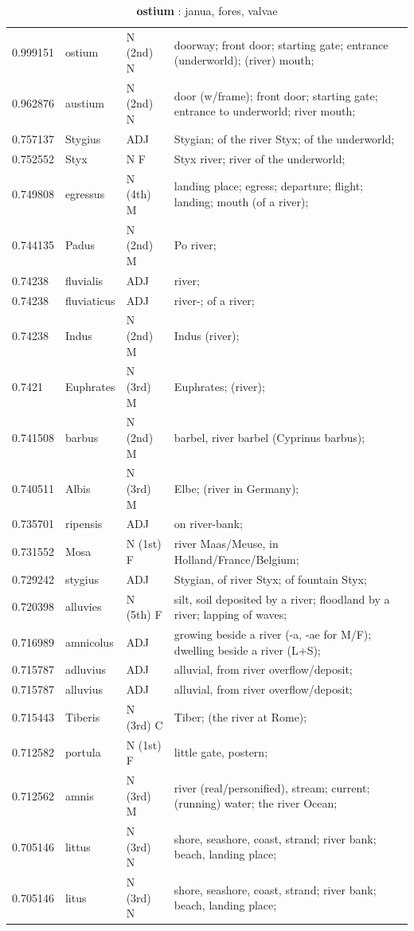 \documentclass[]{article}
\begin{document}
	\begin{table}
	\caption{\textbf{ostium} : janua, fores, valvae \label{ostium}}
	\vspace{.25in}
	\begin{tabular}{l|lll}
	   0.999151 & ostium & N (2nd) N & doorway; front door; starting gate; entrance (underworld); (river) mouth;\\
	   0.962876 & austium & N (2nd) N & door (w/frame); front door; starting gate; entrance to underworld; river mouth;\\
	   0.757137 & Stygius & ADJ & Stygian; of the river Styx; of the underworld;\\
	   0.752552 & Styx & N F & Styx river; river of the underworld;\\
	   0.749808 & egressus & N (4th) M & landing place; egress; departure; flight; landing; mouth (of a river);\\
	   0.744135 & Padus & N (2nd) M & Po river;\\
	   0.74238 & fluvialis & ADJ & river;\\
	   0.74238 & fluviaticus & ADJ & river-; of a river;\\
	   0.74238 & Indus & N (2nd) M & Indus (river);\\
	   0.7421 & Euphrates & N (3rd) M & Euphrates; (river);\\
	   0.741508 & barbus & N (2nd) M & barbel, river barbel (Cyprinus barbus);\\
	   0.740511 & Albis & N (3rd) M & Elbe; (river in Germany);\\
	   0.735701 & ripensis & ADJ & on river-bank;\\
	   0.731552 & Mosa & N (1st) F & river Maas/Meuse, in Holland/France/Belgium;\\
	   0.729242 & stygius & ADJ & Stygian, of river Styx; of fountain Styx;\\
	   0.720398 & alluvies & N (5th) F & silt, soil deposited by a river; floodland by a river; lapping of waves;\\
	   0.716989 & amnicolus & ADJ & growing beside a river (-a, -ae for M/F); dwelling beside a river (L+S);\\
	   0.715787 & adluvius & ADJ & alluvial, from river overflow/deposit;\\
	   0.715787 & alluvius & ADJ & alluvial, from river overflow/deposit;\\
	   0.715443 & Tiberis & N (3rd) C & Tiber; (the river at Rome);\\
	   0.712582 & portula & N (1st) F & little gate, postern;\\
	   0.712562 & amnis & N (3rd) M & river (real/personified), stream; current; (running) water; the river Ocean;\\
	   0.705146 & littus & N (3rd) N & shore, seashore, coast, strand; river bank; beach, landing place;\\
	   0.705146 & litus & N (3rd) N & shore, seashore, coast, strand; river bank; beach, landing place;\\
	\end{tabular}
	\end{table}
\end{document}
